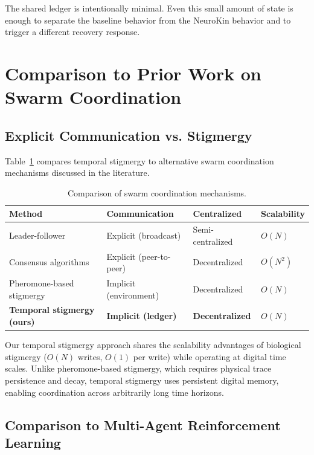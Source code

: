 \documentclass[12pt,a4paper,oneside]{report}
\begin{document}
The shared ledger is intentionally minimal. Even this small amount of state is enough to separate the baseline behavior from the NeuroKin behavior and to trigger a different recovery response.

\section{Comparison to Prior Work on Swarm Coordination}

\subsection{Explicit Communication vs. Stigmergy}
\label{subsec:explicit_communication_vs_stigmergy}

Table~\ref{tab:swarm_comparison_lit} compares temporal stigmergy to alternative swarm coordination mechanisms discussed in the literature.

\begin{table}[H]
\centering
\small
\setlength{\tabcolsep}{4pt}
\caption{Comparison of swarm coordination mechanisms.}
\label{tab:swarm_comparison_lit}
\begin{tabular}{>{\raggedright\arraybackslash}p{4.0cm} >{\raggedright\arraybackslash}p{4.0cm} >{\centering\arraybackslash}p{2.6cm} >{\centering\arraybackslash}p{2.6cm}}
\toprule
\textbf{Method} & \textbf{Communication} & \textbf{Centralized} & \textbf{Scalability} \\
\midrule
Leader-follower & Explicit (broadcast) & Semi-centralized & $O(N)$ \\
Consensus algorithms & Explicit (peer-to-peer) & Decentralized & $O(N^2)$ \\
Pheromone-based stigmergy & Implicit (environment) & Decentralized & $O(N)$ \\
\textbf{Temporal stigmergy (ours)} & \textbf{Implicit (ledger)} & \textbf{Decentralized} & \textbf{$O(N)$} \\
\bottomrule
\end{tabular}
\end{table}

Our temporal stigmergy approach shares the scalability advantages of biological stigmergy ($O(N)$ writes, $O(1)$ per write) while operating at digital time scales. Unlike pheromone-based stigmergy, which requires physical trace persistence and decay, temporal stigmergy uses persistent digital memory, enabling coordination across arbitrarily long time horizons.

\subsection{Comparison to Multi-Agent Reinforcement Learning}
\label{subsec:comparison_to_multi_agent_reinforcement_learning}
\end{document}

